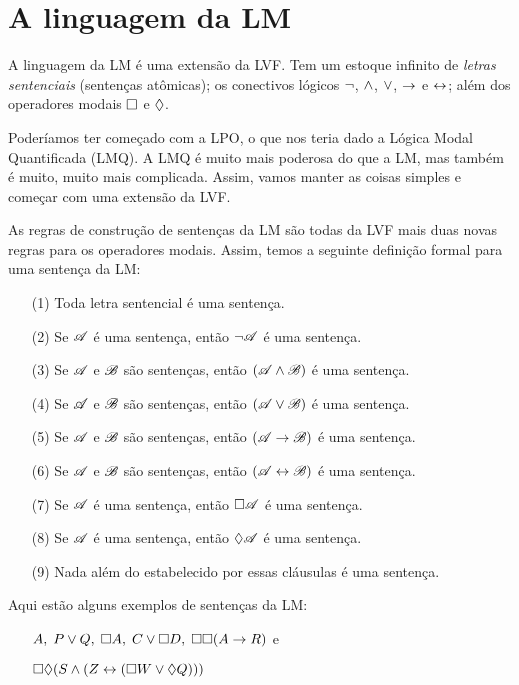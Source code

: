\section{A linguagem da LM}
\label{TFLtoML}


A linguagem da LM é uma extensão da LVF. Tem um estoque infinito de \emph{letras sentenciais} (sentenças atômicas); os conectivos lógicos $\neg$, $\wedge$,  $\vee$,    $\rightarrow$  e $\leftrightarrow$; além dos  operadores modais  $\Box$ e $\Diamond$.

Poderíamos ter começado com a LPO, o que nos teria dado a Lógica Modal Quantificada (LMQ). A LMQ é muito mais poderosa do que a LM, mas também é muito, muito mais complicada. Assim,  vamos manter as coisas simples e começar com uma extensão da LVF. 

As regras de construção de  sentenças da LM são todas da LVF mais duas novas regras para os operadores modais. Assim, temos a seguinte definição formal para uma sentença da LM:
 
\begin{itemize}
	\item[(1)]Toda letra sentencial é uma sentença. 
	\item[(2)]Se $\mathscr{A}$ é uma sentença, então $\neg\mathscr{A}$ é uma sentença. 
	\item[(3)]Se $\mathscr{A}$ e $\mathscr{B}$ são sentenças, então $(\mathscr{A}\wedge\mathscr{B})$ é uma sentença.
	\item[(4)]Se $\mathscr{A}$ e $\mathscr{B}$ são sentenças, então $(\mathscr{A}\vee\mathscr{B})$ é uma sentença.
	\item[(5)]Se $\mathscr{A}$ e $\mathscr{B}$ são sentenças, então $(\mathscr{A}\rightarrow\mathscr{B})$ é uma sentença.
	\item[(6)]Se $\mathscr{A}$ e $\mathscr{B}$ são sentenças, então $(\mathscr{A}\leftrightarrow\mathscr{B})$ é uma sentença.
	\item[(7)]Se $\mathscr{A}$ é uma sentença, então $\Box\mathscr{A}$ é uma sentença.
	\item[(8)]Se $\mathscr{A}$ é uma sentença, então $\Diamond\mathscr{A}$ é uma sentença.
	\item[(9)]Nada além do estabelecido por essas cláusulas é uma sentença. 
\end{itemize}
Aqui estão alguns exemplos de sentenças  da LM:
\begin{itemize}
	\item[]$A,\;P\vee Q,\;\Box A,\;C\vee \Box D,\;\Box\Box (A\rightarrow R)$ e 
	\item[]$\Box\Diamond (S\wedge (Z\leftrightarrow (\Box W \vee \Diamond Q)))$
\end{itemize}

